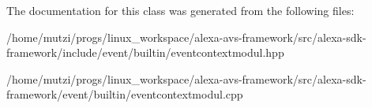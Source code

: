 The documentation for this class was generated from the following files\+:\begin{DoxyCompactItemize}
\item 
/home/mutzi/progs/linux\+\_\+workspace/alexa-\/avs-\/framework/src/alexa-\/sdk-\/framework/include/event/builtin/eventcontextmodul.\+hpp\item 
/home/mutzi/progs/linux\+\_\+workspace/alexa-\/avs-\/framework/src/alexa-\/sdk-\/framework/event/builtin/eventcontextmodul.\+cpp\end{DoxyCompactItemize}
